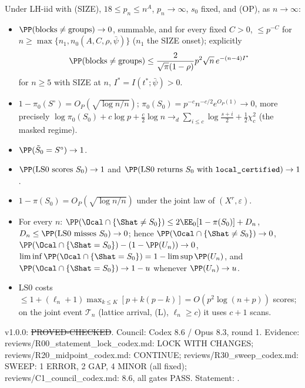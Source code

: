 \begin{theorem}[PXN]\label{reg:W1-PXN_Thm-PXN}
Under LH-iid with (SIZE), $18\le p_n\le n^A$, $p_n\to\infty$, $s_0$ fixed, and (OP), as $n\to\infty$:
\begin{itemize}
\item[(R)] $\PP(\text{blocks}\ne\text{groups})\to0$, summable, and for every fixed $C>0$, $\le p^{-C}$ for $n\ge\max\{n_1,\allowbreak n_0(A,C,\rho,\bar{\psi})\}$  ($n_1$ the SIZE onset); explicitly \[\PP(\text{blocks}\ne\text{groups})\le\frac{2}{\sqrt\pi(1-\rho)}p^2\sqrt n\,e^{-(n-4)I^*}\] for $n\ge5$ with SIZE at $n$, $I^*=I(t^*;\bar{\psi})>0$.
\item[(S)] $1-\pi_0(S^\circ)=O_P(\sqrt{\log n/n})$; $\pi_0(S_0)=p^{-c}n^{-c/2}e^{O_P(1)}\to0$, more precisely $\log\pi_0(S_0)+c\log p+\frac c2\log n\to_d\sum_{i\le c}\log\frac{s+i}2+\frac12\chi^2_c$ (the masked regime).
\item[(E)] $\PP(\tilde{S}_0=S^\circ)\to1$.
\item[(T)] $\PP(\text{LS0 scores }S_0)\to1$ and $\PP(\text{LS0 returns }S_0\text{ with \texttt{local\_certified}})\to1$.
\item[(P)] $1-\pi(S_0)=O_P(\sqrt{\log n/n})$ under the joint law of $(X^r,\varepsilon)$.
\item[(C)] For every $n$: $\PP(\Ocal\cap\{\Shat\ne S_0\})\le2\EE_0[1-\pi(S_0)]+D_n$, $D_n\le\PP(\text{LS0 misses }S_0)\to0$; hence $\PP(\Ocal\cap\{\Shat\ne S_0\})\to0$, $\PP(\Ocal\cap\{\Shat=S_0\})-(1-\PP(U_n))\to0$, $\liminf\PP(\Ocal\cap\{\Shat=S_0\})=1-\limsup\PP(U_n)$, and $\PP(\Ocal\cap\{\Shat=S_0\})\to1-u$ whenever $\PP(U_n)\to u$.
\item[(K)] LS0 costs $\le1+(\ell_n+1)\max_{k\le K}[p+k(p-k)]=O(p^2\log(n+p))$ scores; on the joint event $\mathcal T_n$ (lattice arrival, (L), $\ell_n\ge c$) it uses $c+1$ scans.
\end{itemize}
\end{theorem}
\begin{statusbox}
 v1.0.0: \st{PROVED-CHECKED}. Council: Codex 8.6 / Opus 8.3, round 1. Evidence: reviews/R00\_statement\_lock\_codex.md: LOCK WITH CHANGES; reviews/R20\_midpoint\_codex.md: CONTINUE; reviews/R30\_sweep\_codex.md: SWEEP: 1 ERROR, 2 GAP, 4 MINOR (all fixed); reviews/C1\_council\_codex.md: 8.6, all gates PASS. Statement: .
\end{statusbox}

